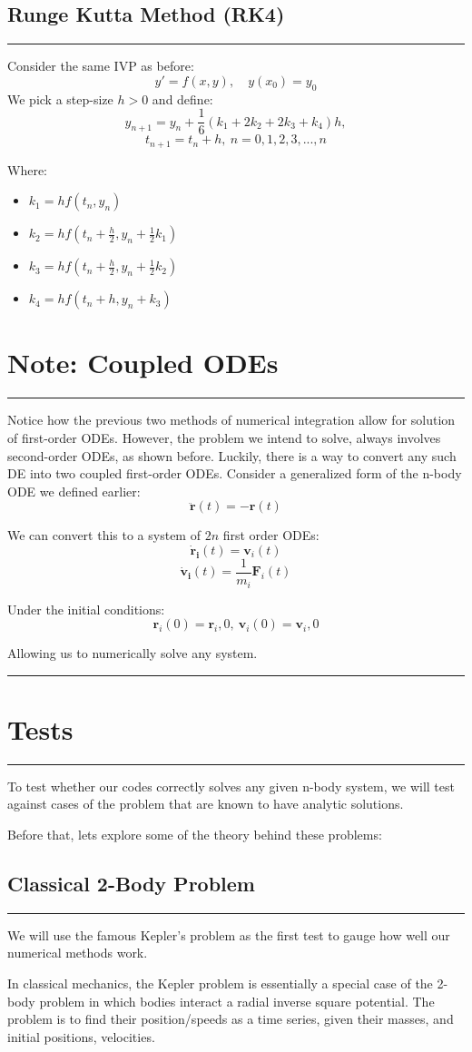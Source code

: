 \documentclass[hidelinks, 11pt, dvipsnames]{article}
\newcommand{\psection}[1]{{
    \begin{center}
        \noindent \rule{17cm}{0.4pt}
            \section*{\LARGE #1}
        \noindent \rule{17cm}{0.4pt}
    \end{center}
}}
\newcommand{\psubsection}[1]{{
    \begin{center}
            \section*{\Large #1}
        \noindent \rule{17cm}{0.2pt}
    \end{center}
}}
\newcommand{\psubsubsection}[1]{{
    \section*{#1}
    \noindent \rule{17cm}{0.11pt}
}}
\begin{document}
\psubsection{Runge Kutta Method (RK4)}
Consider the same IVP as before:
$$ \label{eq:3.1.1} y'=f(x,y),\quad y(x_0)=y_0 $$
We pick a step-size $h>0$ and define:
$$ y_{n+1} = y_n + \frac{1}{6}(k_1 + 2k_2 + 2k_3 + k_4)h, $$
$$ t_{n+1} = t_n + h, \ n= 0,1,2,3,...,n $$

Where:
\begin{itemize}
    \item $k_{1}=h f\left(t_{n}, y_{n}\right)$
    \item $k_{2}=h f\left(t_{n}+\frac{h}{2}, y_{n}+\frac{1}{2} k_{1}\right)$
    \item $k_{3}=h f\left(t_{n}+\frac{h}{2}, y_{n}+\frac{1}{2} k_{2}\right)$
    \item $k_{4}=h f\left(t_{n}+h, y_{n}+k_{3}\right)$
\end{itemize}

\psubsubsection{Note: Coupled ODEs}
Notice how the previous two methods of numerical integration allow for solution of first-order ODEs. However, the problem we intend to solve, always involves second-order ODEs, as shown before. Luckily, there is a way to convert any such DE into two coupled first-order ODEs. Consider a generalized form of the n-body ODE we defined earlier:
$$  \mathbf{\ddot{r}}(t) = -\mathbf{r}(t) $$

We can convert this to a system of $2n$ first order ODEs:
$$  \mathbf{\dot{r}_i}(t) = \mathbf{v}_i(t)$$
$$\mathbf{\dot{v}_i}(t) = \frac{1}{m_i}\mathbf{F}_i(t)$$

Under the initial conditions:
$$ \mathbf{r}_i(0) = \mathbf{r}_i,0, \ \mathbf{v}_i(0) = \mathbf{v}_i,0 $$

Allowing us to numerically solve any system.
\newpage

\psection{Tests}
To test whether our codes correctly solves any given n-body system, we will test against cases of the problem that are known to have analytic solutions.

Before that, lets explore some of the theory behind these problems:
\psubsection{Classical 2-Body Problem}

We will use the famous Kepler's problem as the first test to gauge how well our numerical methods work. 

In classical mechanics, the Kepler problem is essentially a special case of the 2-body problem in which bodies interact a radial inverse square potential. The problem is to find their position/speeds as a time series, given their masses, and initial positions, velocities. 
\end{document}
